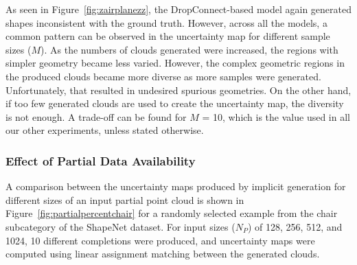         As seen in Figure~\ref{fig:zairplanezz}, the DropConnect-based model again generated shapes inconsistent with the ground truth. However, across all the models, a common pattern can be observed in the uncertainty map for different sample sizes ($M$). As the numbers of clouds generated were increased, the regions with simpler geometry became less varied. However, the complex geometric regions in the produced clouds became more diverse as more samples were generated. Unfortunately, that resulted in undesired spurious geometries. On the other hand, if too few generated clouds are used to create the uncertainty map, the diversity is not enough. A trade-off can be found for $M$ = 10, which is the value used in all our other experiments, unless stated otherwise.

        \subsubsection{Effect of Partial Data Availability}
        A comparison between the uncertainty maps produced by implicit generation for different sizes of an input partial point cloud is shown in Figure~\ref{fig:partialpercentchair} for a randomly selected example from the chair subcategory of the ShapeNet dataset. For input sizes ($N_P$) of 128, 256, 512, and 1024, 10 different completions were produced, and uncertainty maps were computed using linear assignment matching between the generated clouds.
